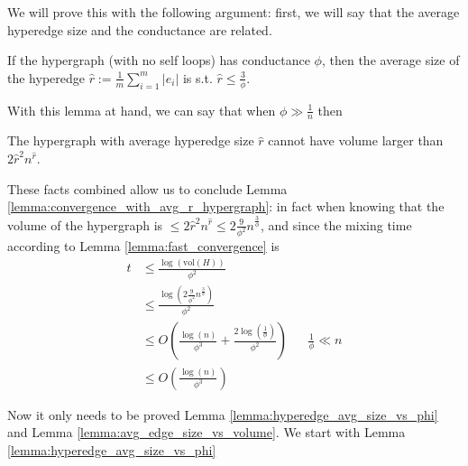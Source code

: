 \documentclass[../main.tex]{subfiles}
\begin{document}
We will prove this with the following argument: first, we will say that the average hyperedge size and the conductance are related.

\begin{lemma}
\label{lemma:hyperedge_avg_size_vs_phi}
    If the hypergraph (with no self loops) has conductance $\phi$, then the average size of the hyperedge $\hat{r}:=\frac{1}{m}\sum_{i=1}^{m} |e_i|$ is s.t. $\hat{r} \leq \frac{3}{\phi}$.
\end{lemma}

With this lemma at hand, we can say that when $\phi \gg \frac{1}{n}$ then

\begin{lemma}
\label{lemma:avg_edge_size_vs_volume}
    The hypergraph with average hyperedge size $\hat{r}$ cannot have volume larger than $2 \hat{r}^2 n^{\hat{r}}$.
\end{lemma}

These facts combined allow us to conclude Lemma \ref{lemma:convergence_with_avg_r_hypergraph}: in fact when knowing that the volume of the hypergraph is $\leq 2 \hat{r}^2 n^{\hat{r}}\leq 2 \frac{9}{\phi^2} n^{\frac{3}{\phi}}$, and since the mixing time according to Lemma \ref{lemma:fast_convergence} is 
\begin{align}
    t &\leq \frac{\log(\text{vol}(H))}{\phi^2} \\
    & \leq \frac{\log(2 \frac{9}{\phi^2} n^{\frac{3}{\phi}})}{\phi^2} \\
    & \leq O\left(\frac{\log(n)}{\phi^3} + \frac{2\log\left(\frac{1}{\phi}\right)}{\phi^2}\right) && \frac{1}{\phi} \ll n \\
    & \leq O\left(\frac{\log(n)}{\phi^3}\right)
\end{align}

Now it only needs to be proved Lemma \ref{lemma:hyperedge_avg_size_vs_phi} and Lemma \ref{lemma:avg_edge_size_vs_volume}. We start with Lemma     \ref{lemma:hyperedge_avg_size_vs_phi}
\end{document}

